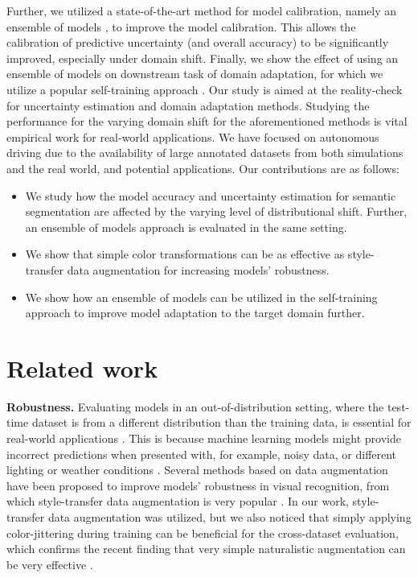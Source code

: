 \documentclass[conference]{IEEEtran}
\begin{document}
Further, we utilized a state-of-the-art method for model calibration, namely an ensemble of models \cite{trustuncertainty, ensemblesuncertainty}, to improve the model calibration. This allows the calibration of predictive uncertainty (and overall accuracy) to be significantly improved, especially under domain shift. Finally, we show the effect of using an ensemble of models on downstream task of domain adaptation, for which we utilize a popular self-training approach \cite{noisystudent,textureinvariant,selfeccv2018}. Our study is aimed at the reality-check for uncertainty estimation and domain adaptation methods. Studying the performance for the varying domain shift for the aforementioned methods is vital empirical work for real-world applications. We have focused on autonomous driving due to the availability of large annotated datasets from both simulations and the real world, and potential applications. Our contributions are as follows:
\begin{itemize}
    \item We study how the model accuracy and uncertainty estimation for semantic segmentation are affected by the varying level of distributional shift. Further, an ensemble of models approach is evaluated in the same setting.
    \item We show that simple color transformations can be as effective as style-transfer data augmentation for increasing models’ robustness.
    \item We show how an ensemble of models can be utilized in the self-training approach to improve model adaptation to the target domain further.
\end{itemize}

\section{Related work}

\textbf{Robustness.} Evaluating models in an out-of-distribution setting, where the test-time dataset is from a different distribution than the training data, is essential for real-world applications \cite{trustuncertainty,concrete, semanticbenchmark}. This is because machine learning models might provide incorrect predictions when presented with, for example, noisy data, or different lighting or weather conditions \cite{HendrycksD19}. Several methods based on data augmentation have been proposed to improve models' robustness in visual recognition, from which style-transfer data augmentation is very popular \cite{cnnbiased, Cygert}. In our work, style-transfer data augmentation was utilized, but we also noticed that simply applying color-jittering during training can be beneficial for the cross-dataset evaluation, which confirms the recent finding that very simple naturalistic augmentation can be very effective \cite{todorealistic, robcompr}.
\end{document}
